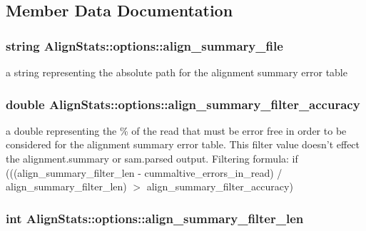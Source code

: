 \subsection{Member Data Documentation}
\hypertarget{struct_align_stats_1_1options_a5b6f3a50319bd5bea781818bd6c83aa0}{
\subsubsection[{align\_\-summary\_\-file}]{\setlength{\rightskip}{0pt plus 5cm}string {\bf AlignStats::options::align\_\-summary\_\-file}}}
\label{struct_align_stats_1_1options_a5b6f3a50319bd5bea781818bd6c83aa0}
a string representing the absolute path for the alignment summary error table \hypertarget{struct_align_stats_1_1options_ac96a618a5c1c0f097c7e3f0c92c4d709}{
\subsubsection[{align\_\-summary\_\-filter\_\-accuracy}]{\setlength{\rightskip}{0pt plus 5cm}double {\bf AlignStats::options::align\_\-summary\_\-filter\_\-accuracy}}}
\label{struct_align_stats_1_1options_ac96a618a5c1c0f097c7e3f0c92c4d709}
a double representing the \% of the read that must be error free in order to be considered for the alignment summary error table. This filter value doesn't effect the alignment.summary or sam.parsed output. Filtering formula: if (((align\_\-summary\_\-filter\_\-len -\/ cummaltive\_\-errors\_\-in\_\-read) / align\_\-summary\_\-filter\_\-len) $>$ align\_\-summary\_\-filter\_\-accuracy) \hypertarget{struct_align_stats_1_1options_ae9989ba9b255f20000d48ac1920bba31}{
\subsubsection[{align\_\-summary\_\-filter\_\-len}]{\setlength{\rightskip}{0pt plus 5cm}int {\bf AlignStats::options::align\_\-summary\_\-filter\_\-len}}}
